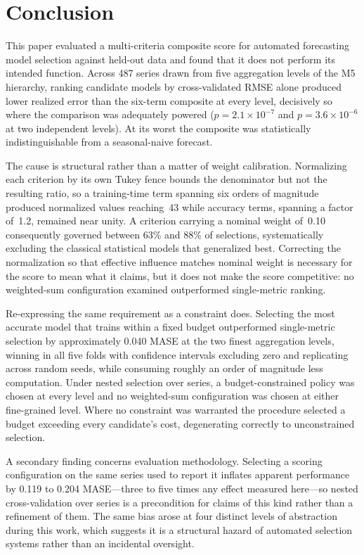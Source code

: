 \section{Conclusion}
\label{sec:conclusion}

This paper evaluated a multi-criteria composite score for automated forecasting model selection against held-out data and found that it does not perform its intended function. Across 487 series drawn from five aggregation levels of the M5 hierarchy, ranking candidate models by cross-validated RMSE alone produced lower realized error than the six-term composite at every level, decisively so where the comparison was adequately powered ($p=2.1\times10^{-7}$ and $p=3.6\times10^{-6}$ at two independent levels). At its worst the composite was statistically indistinguishable from a seasonal-naive forecast.

The cause is structural rather than a matter of weight calibration. Normalizing each criterion by its own Tukey fence bounds the denominator but not the resulting ratio, so a training-time term spanning six orders of magnitude produced normalized values reaching~43 while accuracy terms, spanning a factor of~1.2, remained near unity. A criterion carrying a nominal weight of~0.10 consequently governed between 63\% and 88\% of selections, systematically excluding the classical statistical models that generalized best. Correcting the normalization so that effective influence matches nominal weight is necessary for the score to mean what it claims, but it does not make the score competitive: no weighted-sum configuration examined outperformed single-metric ranking.

Re-expressing the same requirement as a constraint does. Selecting the most accurate model that trains within a fixed budget outperformed single-metric selection by approximately 0.040 MASE at the two finest aggregation levels, winning in all five folds with confidence intervals excluding zero and replicating across random seeds, while consuming roughly an order of magnitude less computation. Under nested selection over series, a budget-constrained policy was chosen at every level and no weighted-sum configuration was chosen at either fine-grained level. Where no constraint was warranted the procedure selected a budget exceeding every candidate's cost, degenerating correctly to unconstrained selection.

A secondary finding concerns evaluation methodology. Selecting a scoring configuration on the same series used to report it inflates apparent performance by 0.119 to 0.204 MASE---three to five times any effect measured here---so nested cross-validation over series is a precondition for claims of this kind rather than a refinement of them. The same bias arose at four distinct levels of abstraction during this work, which suggests it is a structural hazard of automated selection systems rather than an incidental oversight.

